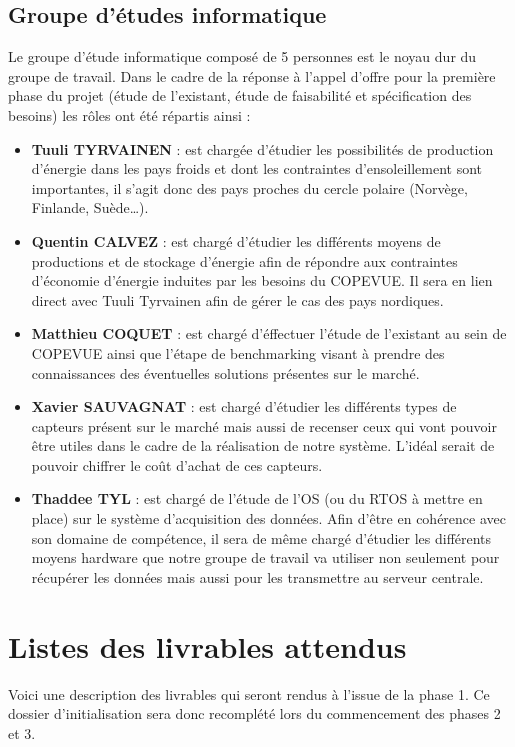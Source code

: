     \subsection{Groupe d'études informatique}
Le groupe d'étude informatique composé de 5 personnes est le noyau dur du groupe de travail. Dans le cadre de la réponse à l'appel d'offre pour la première phase du projet (étude de l'existant, étude de faisabilité et spécification des besoins) les rôles ont été répartis ainsi  :
\begin{itemize}
\item \textbf{Tuuli TYRVAINEN} : est chargée d'étudier les possibilités de production d'énergie dans les pays froids et dont les contraintes d'ensoleillement sont importantes, il s'agit donc des pays proches du cercle polaire (Norvège, Finlande, Suède…).
\item \textbf{Quentin CALVEZ} : est chargé d'étudier les différents moyens de productions et de stockage d'énergie afin de répondre aux contraintes d'économie d'énergie induites par les besoins du COPEVUE. Il sera en lien direct avec Tuuli Tyrvainen afin de gérer le cas des pays nordiques.
\item \textbf{Matthieu COQUET} : est chargé d'éffectuer l'étude de l'existant au sein de COPEVUE ainsi que l'étape de benchmarking visant à prendre des connaissances des éventuelles solutions présentes sur le marché.
\item \textbf{Xavier SAUVAGNAT} : est chargé d'étudier les différents types de capteurs présent sur le marché mais aussi de recenser ceux qui vont pouvoir être utiles dans le cadre de la réalisation de notre système. L'idéal serait de pouvoir chiffrer le coût d'achat de ces capteurs. 
\item \textbf{Thaddee TYL} : est chargé de l'étude de l'OS (ou du RTOS à mettre en place) sur le système d'acquisition des données. Afin d'être en cohérence avec son domaine de compétence, il sera de même chargé d'étudier les différents moyens hardware que notre groupe de travail va utiliser non seulement pour récupérer les données mais aussi pour les transmettre au serveur centrale. 
\end{itemize}

    
    \section{Listes des livrables attendus}
Voici une description des livrables qui seront rendus à l'issue de la phase 1. Ce dossier d'initialisation sera donc recomplété lors du commencement des phases 2 et 3.

